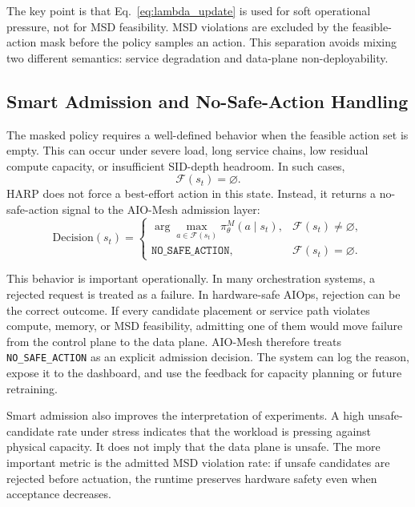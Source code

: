 \documentclass[final,5p]{elsarticle}
\begin{document}
The key point is that Eq.~\eqref{eq:lambda_update} is used for soft operational pressure, not for MSD feasibility. MSD violations are excluded by the feasible-action mask before the policy samples an action. This separation avoids mixing two different semantics: service degradation and data-plane non-deployability.

\subsection{Smart Admission and No-Safe-Action Handling}
\label{subsec:harp_admission}

The masked policy requires a well-defined behavior when the feasible action set is empty. This can occur under severe load, long service chains, low residual compute capacity, or insufficient SID-depth headroom. In such cases,
\begin{equation}
    \mathcal{F}(s_t) = \varnothing.
\end{equation}
HARP does not force a best-effort action in this state. Instead, it returns a no-safe-action signal to the AIO-Mesh admission layer:
\begin{equation}
    \mathrm{Decision}(s_t) =
    \begin{cases}
        \arg\max_{a \in \mathcal{F}(s_t)} \pi_{\theta}^{M}(a \mid s_t),
        & \mathcal{F}(s_t) \neq \varnothing, \\
        \texttt{NO\_SAFE\_ACTION},
        & \mathcal{F}(s_t) = \varnothing.
    \end{cases}
\end{equation}

This behavior is important operationally. In many orchestration systems, a rejected request is treated as a failure. In hardware-safe AIOps, rejection can be the correct outcome. If every candidate placement or service path violates compute, memory, or MSD feasibility, admitting one of them would move failure from the control plane to the data plane. AIO-Mesh therefore treats \texttt{NO\_SAFE\_ACTION} as an explicit admission decision. The system can log the reason, expose it to the dashboard, and use the feedback for capacity planning or future retraining.

Smart admission also improves the interpretation of experiments. A high unsafe-candidate rate under stress indicates that the workload is pressing against physical capacity. It does not imply that the data plane is unsafe. The more important metric is the admitted MSD violation rate: if unsafe candidates are rejected before actuation, the runtime preserves hardware safety even when acceptance decreases.
\end{document}
